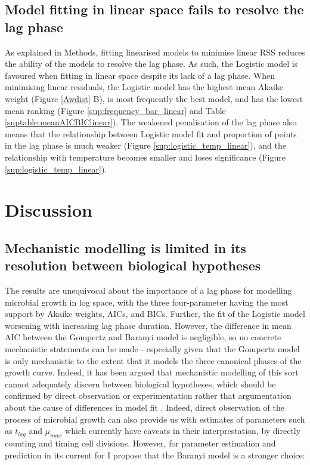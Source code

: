 \documentclass[11pt, a4paper]{article}
\begin{document}
\begin{linenumbers}
\subsection{Model fitting in linear space fails to resolve the lag phase}
As explained in Methods, fitting linearised models to minimise linear RSS reduces the ability of the models to resolve the lag phase. As such, the Logistic model is favoured when fitting in linear space despite its lack of a lag phase. When minimising linear residuals, the Logistic model has the highest mean Akaike weight (Figure \ref{Awdist} B), is most frequently the best model, and has the lowest mean ranking (Figure \ref{sup:frequency_bar_linear} and Table \ref{suptable:meanAICBIClinear}). The weakened penalisation of the lag phase also means that the relationship between Logistic model fit and proportion of points in the lag phase is much weaker (Figure \ref{sup:logistic_temp_linear}), and the relationship with temperature becomes smaller and loses significance (Figure \ref{sup:logistic_temp_linear}).



\section{Discussion}
\subsection{Mechanistic modelling is limited in its resolution between biological hypotheses}
The results are unequivocal about the importance of a lag phase for modelling microbial growth in log space, with the three four-parameter having the most support by Akaike weights, AICs, and BICs. Further, the fit of the Logistic model worsening with increasing lag phase duration. However, the difference in mean AIC between the Gompertz and Baranyi model is negligible, so no concrete mechanistic statements can be made - especially given that the Gompertz model is only mechanistic to the extent that it models the three canonical phases of the growth curve. Indeed, it has been argued that mechanistic modelling of this sort cannot adequately discern between biological hypotheses, which should be confirmed by direct observation or experimentation rather that argumentation about the cause of differences in model fit \cite{MicrobialGrowth}. Indeed, direct observation of the process of microbial growth can also provide us with estimates of parameters such as $t_{lag}$ and $\mu_{max}$ which currently have caveats in their interprestation, by directly counting and timing cell divisions. However, for parameter estimation and prediction in its current for I propose that the Baranyi model is a stronger choice:


\end{linenumbers}
\end{document}
